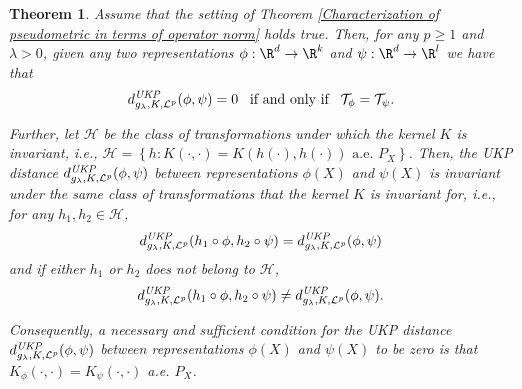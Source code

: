 \documentclass{article} %
\newcommand{\repone}{\phi}
\newcommand{\reptwo}{\psi}
\newcommand{\Tone}{\mathcal{T}_{\repone}}
\newcommand{\Ttwo}{\mathcal{T}_{\reptwo}}
\newcommand{\gl}{g_{\lambda}}
\newcommand{\metricstname}{UKP }
\newcommand{\dLpgl}{d_{\gl,K,\mathcal{L}^{p}}^{\emph{\metricstname}}}
\theoremstyle{plain}
\newcounter{theoremno}
\newtheorem{theorem}[theoremno]{Theorem}
\begin{document}
\begin{theorem}\label{Invariance of UKP distance general case}
     Assume that the setting of Theorem \ref{Characterization of pseudometric in terms of operator norm} holds true. Then, for any $p \geq 1$ and $\lambda>0$, given any two representations $\repone: \R^d \to \R^k$ and $\reptwo: \R^d \to \R^l$ we have that 
     \begin{equation}\label{Necessity and sufficiency of UKP distance being zero if and only if the integral operators coincide}
         \dLpgl(\repone,\reptwo) = 0 \,\ \textrm{ if and only if }\,\ \Tone = \Ttwo .
     \end{equation}

     Further, let $\mathcal{H}$ be the class of transformations under which the kernel $K$ is invariant, i.e., $\mathcal{H} = \left\{h : K(\cdot,\cdot) = K(h(\cdot),h(\cdot))\textrm{ a.e. } P_{X}\right\}$. Then, the \emph{\metricstname} distance $\dLpgl(\repone,\reptwo)$ between representations $\repone(X)$ and $\reptwo(X)$ is invariant under the same class of transformations that the kernel $K$ is invariant for, i.e., for any $h_{1},h_{2} \in \mathcal{H}$, 
\[
\dLpgl(h_{1} \circ \repone,h_{2} \circ \reptwo) = \dLpgl(\repone,\reptwo)
\]
and if either $h_{1}$ or $h_{2}$ does not belong to $\mathcal{H}$, \[
\dLpgl(h_{1} \circ \repone,h_{2} \circ \reptwo) \neq \dLpgl(\repone,\reptwo).
\]

Consequently, a necessary and sufficient condition for the \emph{\metricstname} distance $\dLpgl(\repone,\reptwo)$ between representations $\repone(X)$ and $\reptwo(X)$ to be zero is that $K_{\repone}(\cdot,\cdot) = K_{\reptwo}(\cdot,\cdot)$ a.e. $P_{X}$.
\end{theorem}
\end{document}
